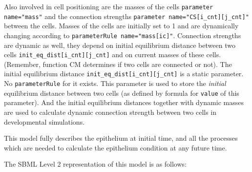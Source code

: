 \documentclass{cekarticle}
\begin{document}
Also involved in cell positioning are the masses of the cells
\texttt{parameter name="mass"} and the connection strengths
\verb+parameter name="CS[i_cnt][j_cnt]"+ between the cells.
Masses of the cells are initially set to 1 and are dynamically
changing according to \texttt{parameterRule name="mass[ic]"}.
Connection strengths are dynamic as well, they depend on initial
equilibrium distance between two cells
\verb+init_eq_dist[i_cnt][j_cnt]+ and on current masses of these
cells. (Remember, function CM determines if two cells are
connected or not). The initial equilibrium distance
\verb+init_eq_dist[i_cnt][j_cnt]+ is a static parameter. No
\texttt{parameterRule} for it exists. This parameter is used to
store the \emph{initial} equilibrium distance between two cells
(as defined by formula for \texttt{value} of this parameter). And
the initial equilibrium distances together with dynamic masses
are used to calculate dynamic connection strength between two
cells in developmental simulations.

This model fully describes the epithelium at initial time, and
all the processes which are needed to calculate the epithelium
condition at any future time.

The SBML Level 2 representation of this model is as follows:
\end{document}
